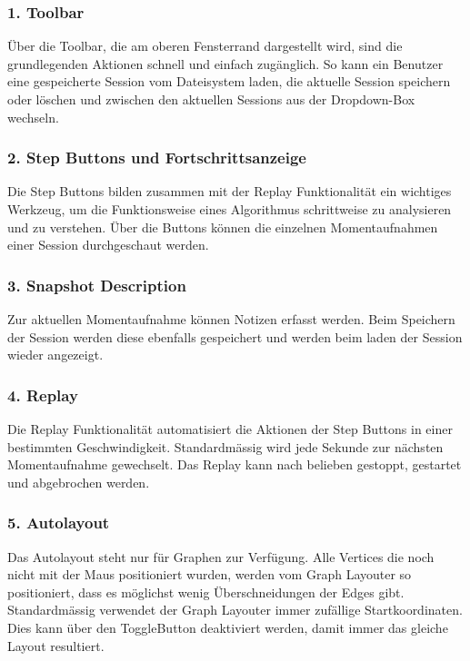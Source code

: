 \documentclass[11pt,a4paper,english,oneside]{book}
\numberwithin{equation}{chapter}
\begin{document}
	\subsubsection{1. Toolbar}
	Über die Toolbar, die am oberen Fensterrand dargestellt wird, sind die grundlegenden Aktionen schnell und einfach zugänglich. So kann ein Benutzer eine gespeicherte Session vom Dateisystem laden, die aktuelle Session speichern oder löschen und zwischen den aktuellen Sessions aus der Dropdown-Box wechseln. 
	
	\subsubsection{2. Step Buttons und Fortschrittsanzeige}
	Die Step Buttons bilden zusammen mit der Replay Funktionalität ein wichtiges Werkzeug, um die Funktionsweise eines Algorithmus schrittweise zu analysieren und zu verstehen. Über die Buttons können die einzelnen Momentaufnahmen einer Session durchgeschaut werden.
	
	\subsubsection{3. Snapshot Description} \label{sssec:snapshotDesc}
	Zur aktuellen Momentaufnahme können Notizen erfasst werden. Beim Speichern der Session werden diese ebenfalls gespeichert und werden beim laden der Session wieder angezeigt.
			
	\subsubsection{4. Replay}
	Die Replay Funktionalität automatisiert die Aktionen der Step Buttons in einer bestimmten Geschwindigkeit. Standardmässig wird jede Sekunde zur nächsten Momentaufnahme gewechselt. Das Replay kann nach belieben gestoppt, gestartet und abgebrochen werden.
	
	\subsubsection{5. Autolayout}
	Das Autolayout steht nur für Graphen zur Verfügung. Alle Vertices die noch nicht mit der Maus positioniert wurden, werden vom Graph Layouter so positioniert, dass es möglichst wenig Überschneidungen der Edges gibt. Standardmässig verwendet der Graph Layouter immer zufällige Startkoordinaten. Dies kann über den ToggleButton deaktiviert werden, damit immer das gleiche Layout resultiert.
	
\end{document}
